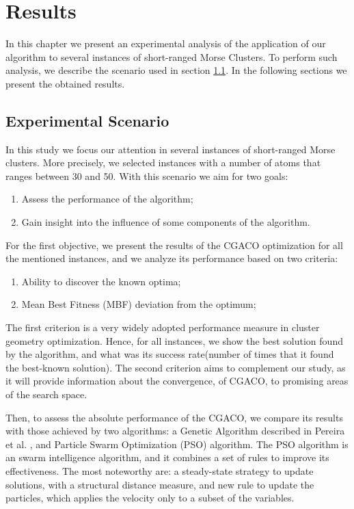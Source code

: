 \chapter{Results}

In this chapter we present an experimental analysis of the application of our algorithm to several instances of short-ranged Morse Clusters. To perform such analysis, we describe the scenario used in section \ref{sec:experimental_scenario}. In the following sections we present the obtained results.




\section{Experimental Scenario}
\label{sec:experimental_scenario}
In this study we focus our attention in several instances of short-ranged Morse clusters. More precisely, we selected instances with a number of atoms that ranges between 30 and 50. With this scenario we aim for two goals: 
	\begin{enumerate}
		\item Assess the performance of the algorithm;
		\item Gain insight into the influence of some components of the algorithm. 
	\end{enumerate}
	
	For the first objective, we present the results of the CGACO optimization for all the mentioned instances, and we analyze its performance based on two criteria:
	\begin{enumerate}
		\item Ability to discover the known optima;
		\item Mean Best Fitness (MBF) deviation from the optimum;
	\end{enumerate}
	
	The first criterion is a very widely adopted performance measure in cluster geometry optimization. Hence, for all instances, we show the best solution found by the algorithm, and what was its success rate(number of times that it found the best-known solution).
	The second criterion aims to complement our study, as it will provide information about the convergence, of CGACO, to promising areas of the search space.
	
	Then, to assess the absolute performance of the CGACO, we compare its results with those achieved by two algorithms: a Genetic Algorithm described in Pereira et al. \cite{xico09}, and Particle Swarm Optimization (PSO) algorithm. The PSO algorithm is an swarm intelligence algorithm, and it combines a set of rules to improve its effectiveness. The most noteworthy are: a steady-state strategy to update solutions, with a structural distance measure, and new rule to update the particles, which applies the velocity only to a subset of the variables.
	
